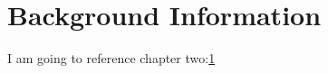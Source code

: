 \chapter{Background Information}
\label{chapter2label}

I am going to reference chapter two:\ref{chapter2label}%

\blindtext
\blindtext
\blindtext
\blindtext
\blindtext
\blindtext
\blindtext
\blindtext
\blindtext
\blindtext
\blindtext
\blindtext
